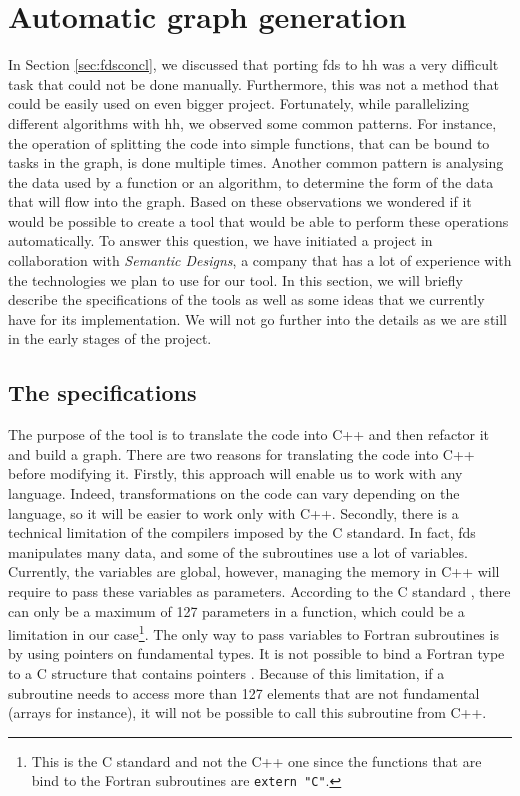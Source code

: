 
\clearpage{}
\section{Automatic graph generation}

In Section \ref{sec:fdsconcl}, we discussed that porting \gls{fds} to
\gls{hh} was a very difficult task that could not be done manually. Furthermore,
this was not a method that could be easily used on even bigger project.
Fortunately, while parallelizing different algorithms with \gls{hh}, we observed
some common patterns. For instance, the operation of splitting the code into
simple functions, that can be bound to tasks in the graph, is done multiple
times. Another common pattern is analysing the data used by a function or an
algorithm, to determine the form of the data that will flow into the graph.
Based on these observations we wondered if it would be possible to create a tool
that would be able to perform these operations automatically. To answer this
question, we have initiated a project in collaboration with \textit{Semantic
Designs}, a company that has a lot of experience with the technologies we plan
to use for our tool. In this section, we will briefly describe the
specifications of the tools as well as some ideas that we currently have for its
implementation. We will not go further into the details as we are still in the
early stages of the project.

\subsection{The specifications}

The purpose of the tool is to translate the code into C++ and then refactor it
and build a graph. There are two reasons for translating the code into C++
before modifying it. Firstly, this approach will enable us to work with any
language. Indeed, transformations on the code can vary depending on the
language, so it will be easier to work only with C++. Secondly, there is a
technical limitation of the compilers imposed by the C standard. In fact,
\gls{fds} manipulates many data, and some of the subroutines use a lot of
variables. Currently, the variables are global, however, managing the memory in
C++ will require to pass these variables as parameters. According to the C
standard \cite{cstd}, there can only be a maximum of 127 parameters in a
function, which could be a limitation in our case\footnote{This is the C
standard and not the C++ one since the functions that are bind to the Fortran
subroutines are \texttt{extern "C"}.}. The only way to pass variables to Fortran
subroutines is by using pointers on fundamental types. It is not possible to
bind a Fortran type to a C structure that contains pointers
\cite{fortranbindstruct}. Because of this limitation, if a subroutine needs to
access more than 127 elements that are not fundamental (arrays for instance), it
will not be possible to call this subroutine from C++.

